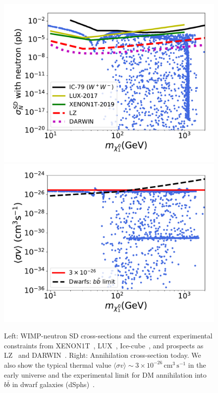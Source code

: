 \documentclass[12pt,letterpaper]{article}
\begin{document}
\begin{figure}
\centering
\includegraphics[scale=0.43]{SD}
\includegraphics[scale=0.43]{sv}
\caption{Left: WIMP-neutron SD cross-sections and the current experimental constraints from XENON1T~\cite{Aprile:2019dbj}, LUX~\cite{Akerib:2017kat}, Ice-cube~\cite{2013PhRvL.110m1302A}, and prospects as LZ~\cite{Akerib:2018lyp} and DARWIN~\cite{Aalbers:2016jon}. Right: Annihilation cross-section today. We also show the typical thermal value $\langle\sigma v\rangle\sim 3\times 10^{-26}\, \text{cm}^3\,\text{s}^{-1}$   in the early universe and the experimental limit for DM annihilation into $b\bar{b}$ in dwarf galaxies (dSphs)~\cite{Ackermann:2015zua}.}
\label{fig:SD-sv}
\end{figure}
\end{document}
